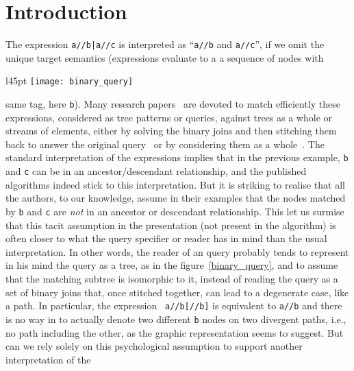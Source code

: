 
\section{Introduction}

\noindent The  expression \texttt{\small a//b|a//c} is
interpreted as ``\texttt{\small a//b} and \texttt{\small a//c}'', if
we omit the unique target semantics (\XPath expressions evaluate to a
a sequence of nodes with
\begin{wrapfigure}[6]{l}{45pt}
\centering
\texttt{[image: binary\_query]}
\caption{\textsf{\small a//b[//c]}\label{binary_query}}
\end{wrapfigure}
same tag, here \texttt{\small b}). Many research
papers~\cite{Cooper:2001,Li:2001,Zhang:2001} are devoted to match
efficiently these expressions, considered as tree patterns or queries,
against \XML trees as a whole or streams of \XML elements, either by
solving the binary joins and then stitching them back to answer the
original query~\cite{AlKhalifa:2002,Chien:2002,Jiang:1:2003,Wu:2003}
or by considering them as a
whole~\cite{Bruno:2002,Jiang:2:2003,Jiao:2005}.  The standard
interpretation of the \XPath expressions implies that in the previous
example, \texttt{\small b} and \texttt{\small c} can be in an
ancestor/descendant relationship, and the published algorithms indeed
stick to this interpretation. But it is striking to realise that all
the authors, to our knowledge, assume in their examples that the nodes
matched by \texttt{\small b} and \texttt{\small c} are \emph{not} in
an ancestor or descendant relationship. This let us surmise that this
tacit assumption in the presentation (not present in the algorithm) is
often closer to what the query specifier or reader has in mind than
the usual interpretation. In other words, the reader of an \XPath
query probably tends to represent in his mind the query as a tree, as
in the figure~\ref{binary_query}, and to assume that the matching
subtree is isomorphic to it, instead of reading the query as a set of
binary joins that, once stitched together, can lead to a degenerate
case, like a path. In particular, the expression \texttt{\small
  a//b[//b]} is equivalent to \texttt{\small a//b} and there is no way
in \XPath to actually denote two different \texttt{\small b} nodes on
two divergent paths, i.e., no path including the other, as the graphic
representation seems to suggest. But can we rely solely on this
psychological assumption to support another interpretation of the
